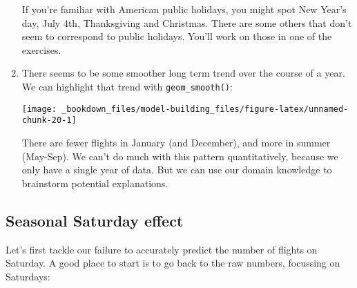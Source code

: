 \documentclass[]{book}
\newenvironment{Shaded}{\begin{snugshade}}{\end{snugshade}}
\newcommand{\KeywordTok}[1]{\textcolor[rgb]{0.13,0.29,0.53}{\textbf{{#1}}}}
\newcommand{\DataTypeTok}[1]{\textcolor[rgb]{0.13,0.29,0.53}{{#1}}}
\newcommand{\DecValTok}[1]{\textcolor[rgb]{0.00,0.00,0.81}{{#1}}}
\newcommand{\FloatTok}[1]{\textcolor[rgb]{0.00,0.00,0.81}{{#1}}}
\newcommand{\StringTok}[1]{\textcolor[rgb]{0.31,0.60,0.02}{{#1}}}
\newcommand{\OtherTok}[1]{\textcolor[rgb]{0.56,0.35,0.01}{{#1}}}
\newcommand{\NormalTok}[1]{{#1}}
\begin{document}
\begin{enumerate}
  If you're familiar with American public holidays, you might spot New
  Year's day, July 4th, Thanksgiving and Christmas. There are some
  others that don't seem to correspond to public holidays. You'll work
  on those in one of the exercises.
\item
  There seems to be some smoother long term trend over the course of a
  year. We can highlight that trend with \texttt{geom\_smooth()}:

\begin{Shaded}
\end{Shaded}

  \begin{center}\texttt{[image: \_bookdown\_files/model-building\_files/figure-latex/unnamed-chunk-20-1]} \end{center}

  There are fewer flights in January (and December), and more in summer
  (May-Sep). We can't do much with this pattern quantitatively, because
  we only have a single year of data. But we can use our domain
  knowledge to brainstorm potential explanations.
\end{enumerate}

\subsection{Seasonal Saturday effect}\label{seasonal-saturday-effect}

Let's first tackle our failure to accurately predict the number of
flights on Saturday. A good place to start is to go back to the raw
numbers, focussing on Saturdays:

\begin{Shaded}
\end{Shaded}
\end{document}
